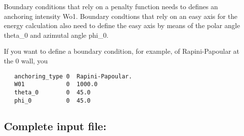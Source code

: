\documentclass{article}
\begin{document}
Boundary conditions that rely on a penalty function needs to defines an anchoring intensity Wo1. Boundary condtions that rely on an easy axis for the energy calculation also need to define the easy axis by means of the polar angle theta_0 and azimutal angle phi_0.

If you want to define a boundary condition, for example, of Rapini-Papoular at the 0 wall, you 
\begin{lstlisting}
   anchoring_type 0  Rapini-Papoular.
   W01            0  1000.0
   theta_0        0  45.0
   phi_0          0  45.0	
\end{lstlisting}




\subsection{Complete input file:}
\end{document}
